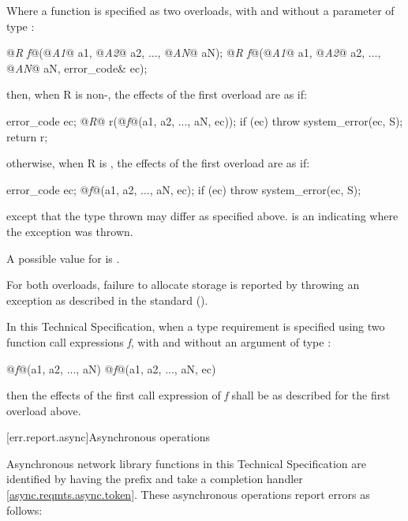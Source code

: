 \pnum
Where a function is specified as two overloads, with and without a parameter of type :

\begin{codeblock}
@\textit{R f}@(@\textit{A1}@ a1, @\textit{A2}@ a2, ..., @\textit{AN}@ aN);
@\textit{R f}@(@\textit{A1}@ a1, @\textit{A2}@ a2, ..., @\textit{AN}@ aN, error_code& ec);
\end{codeblock}

\pnum
then, when R is non-, the effects of the first overload are as if:

\begin{codeblock}
error_code ec;
@\textit{R}@ r(@\textit{f}@(a1, a2, ..., aN, ec));
if (ec) throw system_error(ec, S);
return r;
\end{codeblock}

\pnum
otherwise, when R is , the effects of the first overload are as if:

\begin{codeblock}
error_code ec;
@\textit{f}@(a1, a2, ..., aN, ec);
if (ec) throw system_error(ec, S);
\end{codeblock}

\pnum
except that the type thrown may differ as specified above.  is an \ntbs indicating where the exception was thrown. \begin{note} A possible value for  is . \end{note}

\pnum
 For both overloads, failure to allocate storage is reported by throwing an exception as described in the \Cpp standard ().

\pnum
In this Technical Specification, when a type requirement is specified using two function call expressions \textit{f}, with and without an argument  of type :

\begin{codeblock}
@\textit{f}@(a1, a2, ..., aN)
@\textit{f}@(a1, a2, ..., aN, ec)
\end{codeblock}

\pnum
then the effects of the first call expression of \textit{f} shall be as described for the first overload above.



[err.report.async]{Asynchronous operations}

\pnum
Asynchronous network library functions in this Technical Specification are identified by having the prefix  and take a completion handler \ref{async.reqmts.async.token}. These asynchronous operations report errors as follows:

